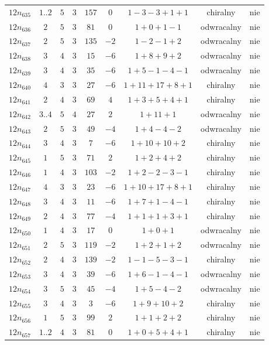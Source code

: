 \begin{longtable}{ccccccccc}
$12n_{635}$ & $1..2$ & $5$ & $3$ & $157$ & $0$ & $1-3-3+1+1$ & chiralny & nie \\
$12n_{636}$ & $2$ & $5$ & $3$ & $81$ & $0$ & $1+0+1-1$ & odwracalny & nie \\
$12n_{637}$ & $2$ & $5$ & $3$ & $135$ & $-2$ & $1-2-1+2$ & odwracalny & nie \\
$12n_{638}$ & $3$ & $4$ & $3$ & $15$ & $-6$ & $1+8+9+2$ & odwracalny & nie \\
$12n_{639}$ & $3$ & $4$ & $3$ & $35$ & $-6$ & $1+5-1-4-1$ & odwracalny & nie \\
$12n_{640}$ & $4$ & $3$ & $3$ & $27$ & $-6$ & $1+11+17+8+1$ & chiralny & nie \\
$12n_{641}$ & $2$ & $4$ & $3$ & $69$ & $4$ & $1+3+5+4+1$ & chiralny & nie \\
$12n_{642}$ & $3..4$ & $5$ & $4$ & $27$ & $2$ & $1+11+1$ & odwracalny & nie \\
$12n_{643}$ & $2$ & $5$ & $3$ & $49$ & $-4$ & $1+4-4-2$ & odwracalny & nie \\
$12n_{644}$ & $3$ & $4$ & $3$ & $7$ & $-6$ & $1+10+10+2$ & chiralny & nie \\
$12n_{645}$ & $1$ & $5$ & $3$ & $71$ & $2$ & $1+2+4+2$ & chiralny & nie \\
$12n_{646}$ & $1$ & $4$ & $3$ & $103$ & $-2$ & $1+2-2-3-1$ & chiralny & nie \\
$12n_{647}$ & $4$ & $3$ & $3$ & $23$ & $-6$ & $1+10+17+8+1$ & chiralny & nie \\
$12n_{648}$ & $3$ & $4$ & $3$ & $11$ & $-6$ & $1+7+1-4-1$ & chiralny & nie \\
$12n_{649}$ & $2$ & $4$ & $3$ & $77$ & $-4$ & $1+1+1+3+1$ & chiralny & nie \\
$12n_{650}$ & $1$ & $4$ & $3$ & $17$ & $0$ & $1+0+1$ & odwracalny & nie \\
$12n_{651}$ & $2$ & $5$ & $3$ & $119$ & $-2$ & $1+2+1+2$ & odwracalny & nie \\
$12n_{652}$ & $2$ & $4$ & $3$ & $139$ & $-2$ & $1-1-5-3-1$ & chiralny & nie \\
$12n_{653}$ & $3$ & $4$ & $3$ & $39$ & $-6$ & $1+6-1-4-1$ & odwracalny & nie \\
$12n_{654}$ & $3$ & $5$ & $3$ & $45$ & $-4$ & $1+5-4-2$ & odwracalny & nie \\
$12n_{655}$ & $3$ & $4$ & $3$ & $3$ & $-6$ & $1+9+10+2$ & chiralny & nie \\
$12n_{656}$ & $1$ & $5$ & $3$ & $99$ & $2$ & $1+1+2+2$ & chiralny & nie \\
$12n_{657}$ & $1..2$ & $4$ & $3$ & $81$ & $0$ & $1+0+5+4+1$ & chiralny & nie \\

\end{longtable}
